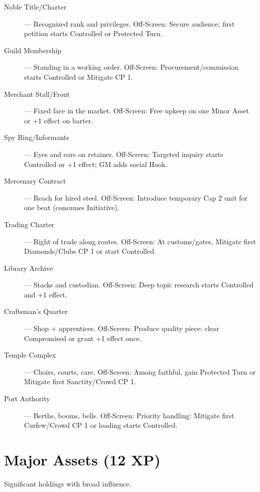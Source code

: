 \begin{description}
  \item[Noble Title/Charter] — Recognized rank and privileges. Off-Screen: Secure audience; first petition starts Controlled or Protected Turn.
  \item[Guild Membership] — Standing in a working order. Off-Screen: Procurement/commission starts Controlled or Mitigate CP 1.
  \item[Merchant Stall/Front] — Fixed face in the market. Off-Screen: Free upkeep on one Minor Asset or +1 effect on barter.
  \item[Spy Ring/Informants] — Eyes and ears on retainer. Off-Screen: Targeted inquiry starts Controlled or +1 effect; GM adds social Hook.
  \item[Mercenary Contract] — Reach for hired steel. Off-Screen: Introduce temporary Cap 2 unit for one beat (consumes Initiative).
  \item[Trading Charter] — Right of trade along routes. Off-Screen: At customs/gates, Mitigate first Diamonds/Clubs CP 1 or start Controlled.
  \item[Library Archive] — Stacks and custodian. Off-Screen: Deep topic research starts Controlled and +1 effect.
  \item[Craftsman's Quarter] — Shop + apprentices. Off-Screen: Produce quality piece: clear Compromised or grant +1 effect once.
  \item[Temple Complex] — Choirs, courts, care. Off-Screen: Among faithful, gain Protected Turn or Mitigate first Sanctity/Crowd CP 1.
  \item[Port Authority] — Berths, booms, bells. Off-Screen: Priority handling: Mitigate first Curfew/Crowd CP 1 or loading starts Controlled.
\end{description}

\section{Major Assets (12 XP)}

Significant holdings with broad influence.

